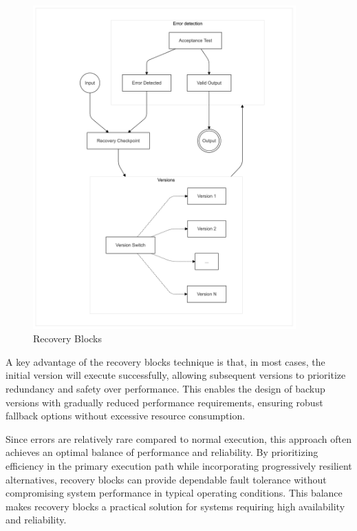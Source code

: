 \documentclass[12pt, letterpaper]{article}
\begin{document}
\begin{figure}[hbt!]
    \centering
    \includegraphics[width=0.9\textwidth]{recovery_blocks/recovery_blocks_01.png}
    \caption{Recovery Blocks}
    \label{fig:rec_blo}
\end{figure}

A key advantage of the recovery blocks technique is that, in most cases, the initial version will execute successfully, allowing subsequent versions to prioritize redundancy and safety over performance. This enables the design of backup versions with gradually reduced performance requirements, ensuring robust fallback options without excessive resource consumption.

Since errors are relatively rare compared to normal execution, this approach often achieves an optimal balance of performance and reliability. By prioritizing efficiency in the primary execution path while incorporating progressively resilient alternatives, recovery blocks can provide dependable fault tolerance without compromising system performance in typical operating conditions. This balance makes recovery blocks a practical solution for systems requiring high availability and reliability.
\end{document}
